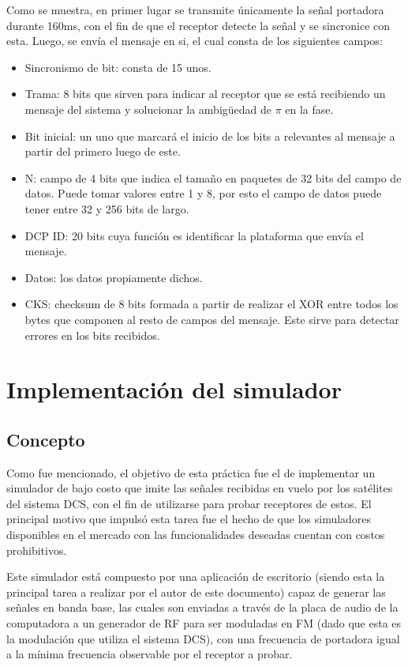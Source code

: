 \documentclass[a4paper,10pt]{article}
\begin{document}
Como se muestra, en primer lugar se transmite únicamente la señal portadora durante 160ms, con el fin de que el receptor detecte la señal y se sincronice con esta. Luego, se envía el mensaje en si, el cual consta de los siguientes campos:
\begin{itemize}
\item Sincronismo de bit: consta de 15 unos.
\item Trama: 8 bits que sirven para indicar al receptor que se está recibiendo un mensaje del sistema y solucionar la ambigüedad de $\pi$ en la fase.
\item Bit inicial: un uno que marcará el inicio de los bits a relevantes al mensaje a partir del primero luego de este.
\item N: campo de 4 bits que indica el tamaño en paquetes de 32 bits del campo de datos. Puede tomar valores entre 1 y 8, por esto el campo de datos puede tener entre 32 y 256 bits de largo.
\item DCP ID: 20 bits cuya función es identificar la plataforma que envía el mensaje.
\item Datos: los datos propiamente dichos.
\item CKS: checksum de 8 bits formada a partir de realizar el XOR entre todos los bytes que componen al resto de campos del mensaje. Este sirve para detectar errores en los bits recibidos.
\end{itemize}

\section{Implementación del simulador}
\subsection{Concepto}
Como fue mencionado, el objetivo de esta práctica fue el de implementar un simulador de bajo costo que imite las señales recibidas en vuelo por los satélites del sistema DCS, con el fin de utilizarse para probar receptores de estos. El principal motivo que impulsó esta tarea fue el hecho de que los simuladores disponibles en el mercado con las funcionalidades deseadas cuentan con costos prohibitivos.
\par
Este simulador está compuesto por una aplicación de escritorio (siendo esta  la principal tarea a realizar por el autor de este documento) capaz de generar las señales en banda base, las cuales son enviadas a través de la placa de audio de la computadora a un
generador de RF para ser moduladas en FM (dado que esta es la modulación que utiliza el sistema DCS), con una frecuencia de portadora igual a la mínima frecuencia observable por el receptor a probar. 
\end{document}
